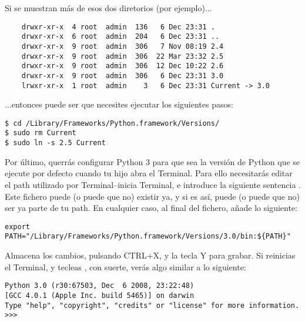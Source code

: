 \begin{MAC}
\noindent
Si se muestran más de esos dos diretorios (por ejemplo)$\ldots$

\begin{listing}
\begin{verbatim}
    drwxr-xr-x  4 root  admin  136   6 Dec 23:31 .
    drwxr-xr-x  6 root  admin  204   6 Dec 23:31 ..
    drwxr-xr-x  9 root  admin  306   7 Nov 08:19 2.4
    drwxr-xr-x  9 root  admin  306  22 Mar 23:32 2.5
    drwxr-xr-x  9 root  admin  306  12 Dec 10:22 2.6
    drwxr-xr-x  9 root  admin  306   6 Dec 23:31 3.0
    lrwxr-xr-x  1 root  admin    3   6 Dec 23:31 Current -> 3.0
\end{verbatim}
\end{listing}

\noindent
$\ldots$entonces puede ser que necesites ejecutar los siguientes pasos:

\begin{listing}
\begin{verbatim}
$ cd /Library/Frameworks/Python.framework/Versions/
$ sudo rm Current
$ sudo ln -s 2.5 Current
\end{verbatim}
\end{listing}

Por último, querrás configurar Python 3 para que sea la versión de Python que se ejecute por defecto cuando tu hijo abra el Terminal. Para ello necesitarás editar el path utilizado por Terminal--inicia Terminal, e introduce la siguiente sentencia .  Este fichero puede (o puede que no) existir ya, y si es así, puede (o puede que no) ser ya parte de tu path. En cualquier caso, al final del fichero, añade lo siguiente:

\begin{listing}
\begin{verbatim}
export PATH="/Library/Frameworks/Python.framework/Versions/3.0/bin:${PATH}"
\end{verbatim}
\end{listing}

Almacena los cambios, pulsando CTRL+X, y la tecla Y para grabar. Si reinicias el Terminal, y tecleas , con suerte, verás algo similar a lo siguiente:

\begin{listing}
\begin{verbatim}
Python 3.0 (r30:67503, Dec  6 2008, 23:22:48) 
[GCC 4.0.1 (Apple Inc. build 5465)] on darwin
Type "help", "copyright", "credits" or "license" for more information.
>>>
\end{verbatim}
\end{listing}

\end{MAC}

